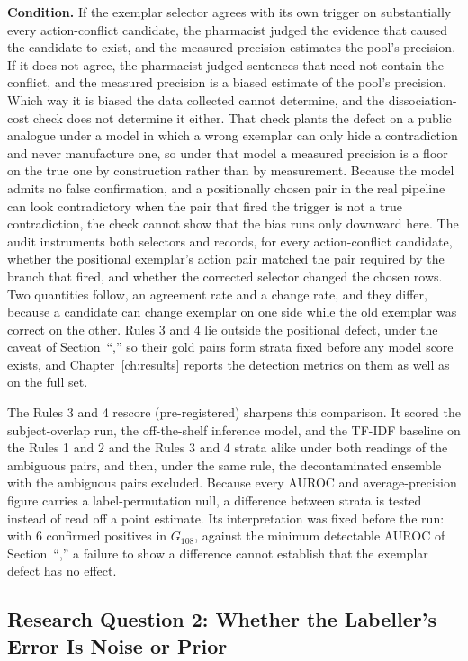 \textbf{Condition.} If the exemplar selector agrees with its own trigger on substantially every
action-conflict candidate, the pharmacist judged the evidence that caused the candidate to exist,
and the measured precision estimates the pool's precision. If it does not agree, the pharmacist judged sentences that need not contain the conflict, and the measured precision is a biased estimate of the pool's precision. Which way it is biased the data collected cannot determine, and the dissociation-cost check does not determine it either. That check plants the defect on a public analogue under a model in which a wrong exemplar can only hide a contradiction and never manufacture one, so under that model a measured precision is a floor on the true one by construction rather than by measurement. Because the model admits no false confirmation, and a positionally chosen pair in the real pipeline can look contradictory when the pair that fired the trigger is not a true contradiction, the check cannot show that the bias runs only downward here. The audit instruments both selectors and records, for every action-conflict candidate, whether the
positional exemplar's action pair matched the pair required by the branch that fired, and whether
the corrected selector changed the chosen rows. Two quantities follow, an agreement rate and a change rate, and they differ, because a
candidate can change exemplar on one side while the old exemplar was correct on the other. Rules 3 and 4 lie outside the positional defect, under the caveat of Section~``,'' so their gold pairs form strata fixed before any model score exists, and Chapter~\ref{ch:results} reports the
detection metrics on them as well as on the full set. 

The Rules 3 and 4 rescore (pre-registered) sharpens this comparison. It scored the subject-overlap run,
the off-the-shelf inference model, and the TF-IDF baseline on the Rules 1 and 2 and the Rules 3 and 4
strata alike under both readings of the ambiguous pairs, and then, under the same rule, the
decontaminated ensemble with the ambiguous pairs excluded. Because every AUROC and average-precision figure carries a label-permutation null, a difference between strata is tested instead of read off a point estimate. Its interpretation was
fixed before the run: with 6 confirmed positives in $G_{108}$, against the minimum detectable AUROC
of Section~``,'' a failure to show a difference cannot establish that the exemplar defect has no effect.

\subsection{Research Question 2: Whether the Labeller's Error Is Noise or Prior}
\label{sec:m-control-rq2}

